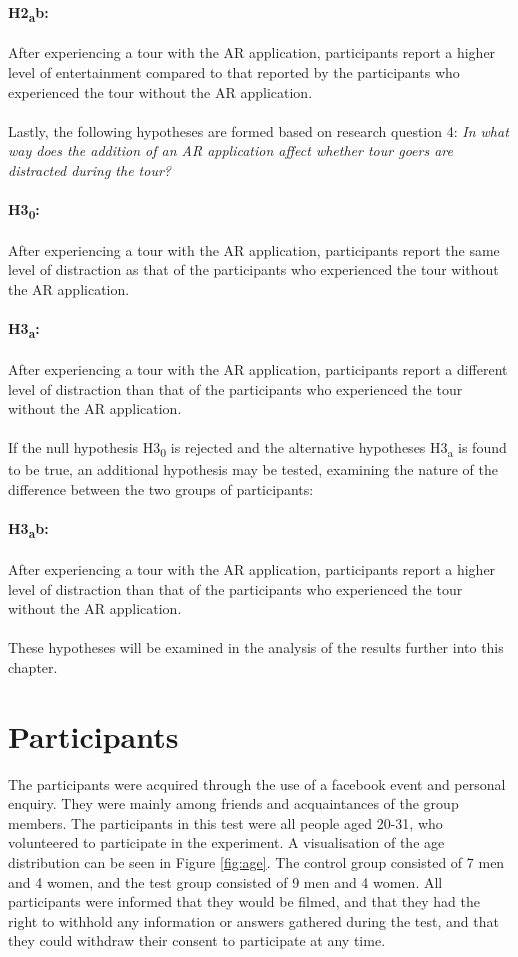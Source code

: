 \paragraph{H2\textsubscript{a}b:} After experiencing a tour with the AR application, participants report a higher level of entertainment compared to that reported by the participants who experienced the tour without the AR application.\\
\\
Lastly, the following hypotheses are formed based on research question 4: \textit{In what way does the addition of an AR application affect whether tour goers are distracted during the tour?}

\paragraph{H3\textsubscript{0}:} After experiencing a tour with the AR application, participants report the same level of distraction as that of the participants who experienced the tour without the AR application.

\paragraph{H3\textsubscript{a}:}After experiencing a tour with the AR application, participants report a different level of distraction than that of the participants who experienced the tour without the AR application.\\
\\
If the null hypothesis H3\textsubscript{0} is rejected and the alternative hypotheses H3\textsubscript{a} is found to be true, an additional hypothesis may be tested, examining the nature of the difference between the two groups of participants:

\paragraph{H3\textsubscript{a}b:} After experiencing a tour with the AR application, participants report a higher level of distraction than that of the participants who experienced the tour without the AR application.\\
\\
These hypotheses will be examined in the analysis of the results further into this chapter.

\section{Participants}
The participants were acquired through the use of a facebook event and personal enquiry. They were mainly among friends and acquaintances of the group members.  
The participants in this test were all people aged 20-31, who volunteered to participate in the experiment. A visualisation of the age distribution can be seen in Figure \ref{fig:age}. The control group consisted of 7 men and 4 women, and the test group consisted of 9 men and 4 women. All participants were informed that they would be filmed, and that they had the right to withhold any information or answers gathered during the test, and that they could withdraw their consent to participate at any time.

